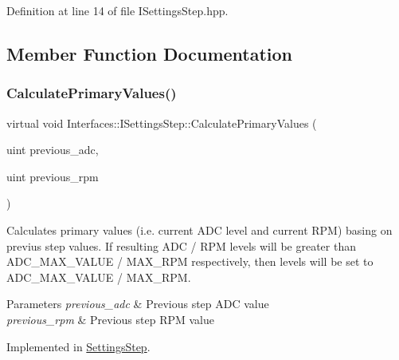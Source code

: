 Definition at line 14 of file I\+Settings\+Step.\+hpp.



\subsection{Member Function Documentation}
\mbox{\label{class_interfaces_1_1_i_settings_step_a04e46c3ebe1f28e0ad0bce23fb863f66}} 
\subsubsection{\texorpdfstring{Calculate\+Primary\+Values()}{CalculatePrimaryValues()}}
{\footnotesize\ttfamily virtual void Interfaces\+::\+I\+Settings\+Step\+::\+Calculate\+Primary\+Values (\begin{DoxyParamCaption}\item[{uint}]{previous\+\_\+adc,  }\item[{uint}]{previous\+\_\+rpm }\end{DoxyParamCaption})\hspace{0.3cm}{\ttfamily [pure virtual]}}



Calculates primary values (i.\+e. current A\+DC level and current R\+PM) basing on previus step values. If resulting A\+DC / R\+PM levels will be greater than A\+D\+C\+\_\+\+M\+A\+X\+\_\+\+V\+A\+L\+UE / M\+A\+X\+\_\+\+R\+PM respectively, then levels will be set to A\+D\+C\+\_\+\+M\+A\+X\+\_\+\+V\+A\+L\+UE / M\+A\+X\+\_\+\+R\+PM. 


\begin{DoxyParams}{Parameters}
{\em previous\+\_\+adc} & Previous step A\+DC value \\
\hline
{\em previous\+\_\+rpm} & Previous step R\+PM value \\
\hline
\end{DoxyParams}


Implemented in \hyperlink{class_settings_step_ac6f79a139ab25cc50ed105f64fc9652f}{Settings\+Step}.

\mbox{\label{class_interfaces_1_1_i_settings_step_ab77c6eaa45707ec4932a8f432b13ad78}} 
